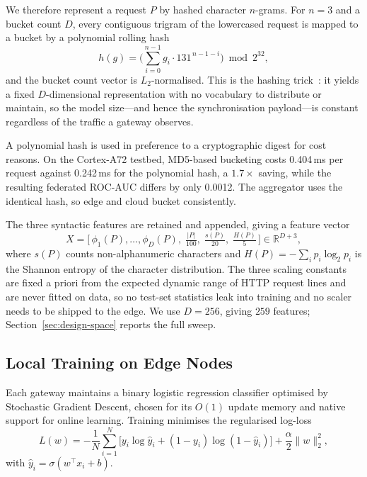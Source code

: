 \documentclass[conference]{IEEEtran}
\begin{document}
We therefore represent a request $P$ by hashed character $n$-grams. For $n=3$ and a bucket count $D$, every contiguous trigram of the lowercased request is mapped to a bucket by a polynomial rolling hash
\begin{equation}
    h(g) = \Big(\sum_{i=0}^{n-1} g_i \cdot 131^{\,n-1-i}\Big) \bmod 2^{32},
\end{equation}
and the bucket count vector is $L_2$-normalised. This is the hashing trick~\cite{weinberger2009}: it yields a fixed $D$-dimensional representation with no vocabulary to distribute or maintain, so the model size---and hence the synchronisation payload---is constant regardless of the traffic a gateway observes.

A polynomial hash is used in preference to a cryptographic digest for cost reasons. On the Cortex-A72 testbed, MD5-based bucketing costs 0.404\,ms per request against 0.242\,ms for the polynomial hash, a $1.7\times$ saving, while the resulting federated ROC-AUC differs by only 0.0012. The aggregator uses the identical hash, so edge and cloud bucket consistently.

The three syntactic features are retained and appended, giving a feature vector
\begin{equation}
    X = \big[\,\phi_1(P),\dots,\phi_D(P),\; \tfrac{|P|}{100},\; \tfrac{s(P)}{20},\; \tfrac{H(P)}{5}\,\big] \in \mathbb{R}^{D+3},
\end{equation}
where $s(P)$ counts non-alphanumeric characters and $H(P) = -\sum_i p_i \log_2 p_i$ is the Shannon entropy of the character distribution. The three scaling constants are fixed a priori from the expected dynamic range of HTTP request lines and are never fitted on data, so no test-set statistics leak into training and no scaler needs to be shipped to the edge. We use $D=256$, giving $259$ features; Section~\ref{sec:design-space} reports the full sweep.

\subsection{Local Training on Edge Nodes}
Each gateway maintains a binary logistic regression classifier optimised by Stochastic Gradient Descent, chosen for its $O(1)$ update memory and native support for online learning. Training minimises the regularised log-loss
\begin{equation}
    L(w) = -\frac{1}{N}\sum_{i=1}^{N}\big[y_i \log \hat{y}_i + (1-y_i)\log(1-\hat{y}_i)\big] + \frac{\alpha}{2}\lVert w \rVert_2^2 ,
\end{equation}
with $\hat{y}_i = \sigma(w^{\!\top} x_i + b)$.
\end{document}
